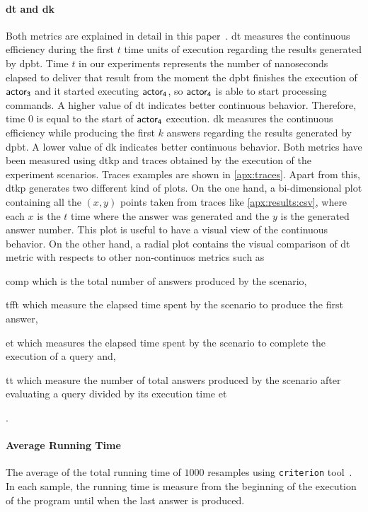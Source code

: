\paragraph{\acrshort{dt} and \acrshort{dk}} Both metrics are explained in detail in this paper~\cite{diefpaper}.
\acrshort{dt} measures the continuous efficiency during the first $t$ time units of execution regarding the results generated by \acrshort{dpbt}. Time $t$ in our experiments represents the number of nanoseconds elapsed to deliver that result from the moment the \acrshort{dpbt} finishes the execution of $\mathsf{actor_3}$ and it started executing $\mathsf{actor_4}$, so $\mathsf{actor_4}$ is able to start processing commands. A higher value of \acrshort{dt} indicates better continuous behavior.
Therefore, time $0$ is equal to the start of $\mathsf{actor_4}$ execution.
\acrshort{dk} measures the continuous efficiency while producing the first $k$ answers regarding the results generated by \acrshort{dpbt}. A lower value of \acrshort{dk} indicates better continuous behavior.
Both metrics have been measured using \acrfull{dtkp} and traces obtained by the execution of the experiment scenarios. Traces examples are shown in \autoref{apx:traces}.
Apart from this, \acrshort{dtkp} generates two different kind of plots. On the one hand, a bi-dimensional plot containing all the $(x,y)$ points taken from traces like \autoref{apx:results:csv}, where each $x$ is the $t$ time where the answer was generated and the $y$ is the generated answer number.
This plot is useful to have a visual view of the continuous behavior. On the other hand, a radial plot contains the visual comparison of \acrshort{dt} metric with respects to other non-continuos metrics such as 
\begin{inparaenum}[\bf i\upshape)]
  \item \acrfull{comp} which is the total number of answers produced by the scenario, 
  \item \acrfull{tfft} which measure the elapsed time spent by the scenario to produce the first answer, 
  \item \acrfull{et} which measures the elapsed time spent by the scenario to complete the execution of a query and, 
  \item \acrfull{tt} which measure the number of total answers produced by the scenario after evaluating a query divided by its execution time \acrshort{et}
\end{inparaenum}.


\paragraph{Average Running Time} The average of the total running time of $1000$ resamples using \texttt{criterion} tool~\cite{criterion}. 
In each sample, the running time is measure from the beginning of the execution of the program until when the last answer is produced.

